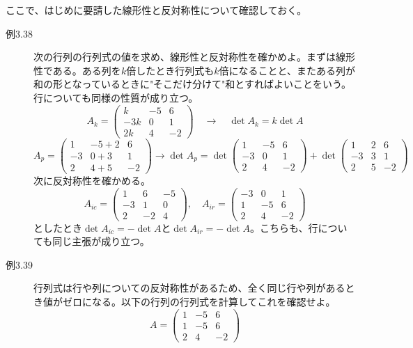 \documentclass[10pt]{jsreport}
\theoremstyle{definition}%
\numberwithin{equation}{section}%
\begin{document}
ここで、はじめに要請した線形性と反対称性について確認しておく。
\begin{description}
  \item[例3.38] 次の行列の行列式の値を求め、線形性と反対称性を確かめよ。まずは線形性である。ある列を$k$倍したとき行列式も$k$倍になることと、またある列が和の形となっているときに"そこだけ分けて"和とすればよいことをいう。行についても同様の性質が成り立つ。
  \begin{equation}
    A_{k}= \begin{pmatrix}
      k & -5 & 6 \\
      -3k & 0 & 1 \\
      2k & 4 & -2
    \end{pmatrix}\quad \to \quad \det A_{k}=k\det A
  \end{equation}
  \begin{equation}
    A_{p}= \begin{pmatrix}
      1 & -5+2 & 6 \\
      -3 & 0+3 & 1 \\
      2 & 4+5 & -2
    \end{pmatrix}\to \det A_{p}=\det \begin{pmatrix}
      1 & -5 & 6 \\
      -3 & 0 & 1 \\
      2 & 4 & -2
    \end{pmatrix}+\det \begin{pmatrix}
      1 & 2 & 6 \\
      -3 & 3 & 1 \\
      2 & 5 & -2
    \end{pmatrix}
  \end{equation}
  次に反対称性を確かめる。
  \begin{equation}
    A_{ic}= \begin{pmatrix}
      1 &  6& -5 \\
      -3 & 1 & 0 \\
      2 & -2& 4
    \end{pmatrix},\quad A_{ir}= \begin{pmatrix}
      -3 & 0 & 1 \\
      1 &  -5 &  6 \\
      2 & 4 & -2
    \end{pmatrix}
  \end{equation}
  としたとき$\det A_{ic}=-\det A$と$\det A_{ir}= -\det A$。こちらも、行についても同じ主張が成り立つ。
\item[例3.39] 行列式は行や列についての反対称性があるため、全く同じ行や列があるとき値がゼロになる。以下の行列の行列式を計算してこれを確認せよ。 \begin{equation}
  A= \begin{pmatrix}
    1 & -5 & 6 \\
    1 & -5 & 6 \\
    2 & 4 & -2
  \end{pmatrix}
\end{equation}
\end{description}
\end{document}
